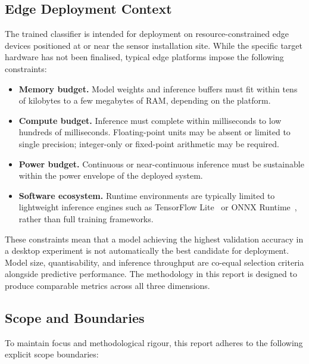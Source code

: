 \subsection{Edge Deployment Context}
\label{sec:problem:edge}

The trained classifier is intended for deployment on
resource-constrained edge devices positioned at or near the sensor
installation site.  While the specific target hardware has not been
finalised, typical edge platforms impose the following constraints:

\begin{itemize}
    \item \textbf{Memory budget.}  Model weights and inference buffers
        must fit within tens of kilobytes to a few megabytes of RAM,
        depending on the platform.
    \item \textbf{Compute budget.}  Inference must complete within
        milliseconds to low hundreds of milliseconds.  Floating-point
        units may be absent or limited to single precision; integer-only
        or fixed-point arithmetic may be required.
    \item \textbf{Power budget.}  Continuous or near-continuous inference
        must be sustainable within the power envelope of the deployed
        system.
    \item \textbf{Software ecosystem.}  Runtime environments are
        typically limited to lightweight inference engines such as
        TensorFlow Lite~\cite{tensorflow_lite} or ONNX
        Runtime~\cite{onnx_runtime}, rather than full training
        frameworks.
\end{itemize}

These constraints mean that a model achieving the highest validation
accuracy in a desktop experiment is not automatically the best candidate
for deployment.  Model size, quantisability, and inference throughput are
co-equal selection criteria alongside predictive performance.  The
methodology in this report is designed to produce comparable metrics
across all three dimensions.

\subsection{Scope and Boundaries}
\label{sec:problem:scope}

To maintain focus and methodological rigour, this report adheres to the
following explicit scope boundaries:

